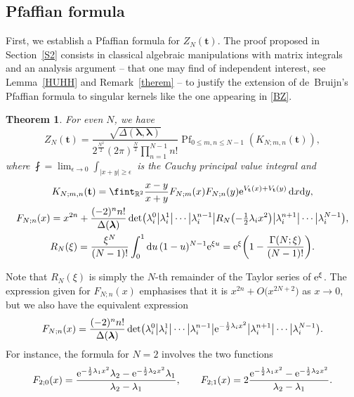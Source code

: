 \documentclass[10pt,a4paper]{amsart}
\numberwithin{equation}{section}
\newcommand{\dd}{\mathrm{d}}
\newtheorem{Theorem}{Theorem}[section]
\begin{document}
\subsection{Pfaffian formula}

First, we establish a Pfaffian formula for $Z_N(\mathbf{t})$. The proof proposed in Section~\ref{S2} consists in classical algebraic manipulations with matrix integrals and an analysis argument -- that one may find of independent interest, see Lemma~\ref{HUHH} and Remark~\ref{therem} -- to justify the extension of de~Bruijn's Pfaffian formula \cite{deBruijn1955} to singular kernels like the one appearing in \eqref{BZ}.
\begin{Theorem}
\label{th:1} For even $N$, we have
\begin{equation}
\label{BZ} Z_N(\mathbf{t}) = \frac{\sqrt{\Delta(\boldsymbol{\lambda},\boldsymbol{\lambda})}}{2^{\frac{N^2}{2}} (2\pi)^{\frac{N}{2}}\prod_{n = 1}^{N - 1} n!} \operatorname{Pf}_{0 \leq m,n \leq N - 1}(K_{N;m,n}(\mathbf{t})),
\end{equation}
where $\fint = \lim_{\epsilon \rightarrow 0} \int_{|x + y| \geq \epsilon}$ is the Cauchy principal value integral and
\begin{gather*}
 K_{N;m,n}(\mathbf{t}) = \fint_{\mathbb{R}^2} \frac{x - y}{x + y} F_{N;m}(x)F_{N;n}(y) {\rm e}^{V_{\mathbf{t}}(x) + V_{\mathbf{t}}(y)}\,\dd x \dd y, \\
F_{N;n}(x) = x^{2n} + \frac{(-2)^n n!}{\Delta(\boldsymbol{\lambda})}\det\bigl(\lambda_i^0 \big| \lambda_i^1 \big| \cdots \big| \lambda_i^{n - 1} \big| R_N\bigl(-\tfrac{1}{2}\lambda_ix^2\bigr) \big| \lambda_i^{n + 1} \big| \cdots \big| \lambda_i^{N - 1}\bigr), \\
R_N(\xi) = \frac{\xi^N}{(N - 1)!} \int_{0}^{1} \dd u\, (1 - u)^{N - 1} {\rm e}^{\xi u} = {\rm e}^{\xi}\biggl(1 - \frac{\Gamma(N;\xi)}{(N - 1)!}\biggr).
\end{gather*}
\end{Theorem}

Note that $R_N(\xi)$ is simply the $N$-th remainder of the Taylor series of ${\rm e}^{\xi}$. The expression given for $F_{N;n}(x)$ emphasises that it is $x^{2n} + O\bigl(x^{2N + 2}\bigr)$ as $x \rightarrow 0$, but we also have the equivalent expression
\[
F_{N;n}(x) = \frac{(-2)^n n!}{\Delta(\boldsymbol{\lambda})} \det\bigl(\lambda_i^0 \big| \lambda_i^1 \big| \cdots \big| \lambda_i^{n - 1} \big| {\rm e}^{-\frac{1}{2}\lambda_i x^2} \big| \lambda_i^{n + 1} \big| \cdots \big| \lambda_i^{N - 1}\bigr).
\]
For instance, the formula for $N = 2$ involves the two functions
\[
F_{2;0}(x) = \frac{{\rm e}^{-\frac{1}{2}\lambda_1 x^2} \lambda_2 - {\rm e}^{-\frac{1}{2}\lambda_2 x^2}\lambda_1}{\lambda_2 - \lambda_1}, \qquad F_{2;1}(x) = 2 \frac{{\rm e}^{-\frac{1}{2}\lambda_1 x^2} - {\rm e}^{-\frac{1}{2}\lambda_2 x^2}}{\lambda_2 - \lambda_1} .
\]
\end{document}
